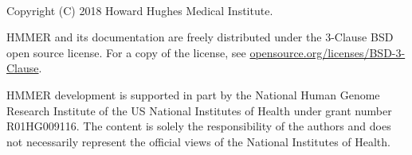 \newpage
\begin{fullwidth}
  ~\vfill
  \thispagestyle{empty}
  \setlength{\parindent}{0pt}
  \setlength{\parskip}{\baselineskip}

\par
Copyright (C) 2018 Howard Hughes Medical Institute.

\par
HMMER and its documentation are freely distributed
under the 3-Clause BSD open source license. For a copy of the license,
see \href{https://opensource.org/licenses/BSD-3-Clause}{opensource.org/licenses/BSD-3-Clause}.

\par
HMMER development is supported in part by the National Human
Genome Research Institute of the US National Institutes of Health under
grant number R01HG009116. The content is solely the responsibility
of the authors and does not necessarily represent the official views of
the National Institutes of Health.

\end{fullwidth}




